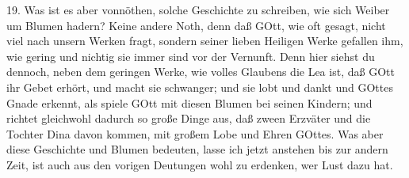 19. Was ist es aber vonnöthen, solche Geschichte zu schreiben, wie sich Weiber um Blumen hadern? Keine andere Noth, denn daß GOtt, wie oft gesagt, nicht viel nach unsern Werken fragt, sondern seiner lieben Heiligen Werke gefallen ihm, wie gering und nichtig sie immer sind vor der Vernunft. Denn hier siehst du dennoch, neben dem geringen Werke, wie volles Glaubens die Lea ist, daß GOtt ihr Gebet erhört, und macht sie schwanger; und sie lobt und dankt und GOttes Gnade erkennt, als spiele GOtt mit diesen Blumen bei seinen Kindern; und richtet gleichwohl dadurch so große Dinge aus, daß zween Erzväter und die Tochter Dina davon kommen, mit großem Lobe und Ehren GOttes. Was aber diese Geschichte und Blumen bedeuten, lasse ich jetzt anstehen bis zur andern Zeit, ist auch aus den vorigen Deutungen wohl zu erdenken, wer Lust dazu hat.

